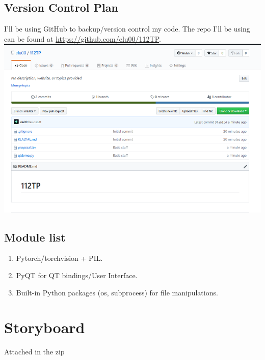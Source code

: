 \documentclass[12pt]{article}
\begin{document}
\subsection{Version Control Plan}
    I'll be using GitHub to backup/version control my code. 
    The repo I'll be using can be found at \href{https://github.com/elu00/112TP}{https://github.com/elu00/112TP}. \\
    \includegraphics[scale=0.8]{screenshot.png}
\subsection{Module list}
\begin{enumerate}
	\item Pytorch/torchvision + PIL.
	\item PyQT for QT bindings/User Interface.
	\item Built-in Python packages (os, subprocess) for file manipulations.
\end{enumerate}
\section{Storyboard}
Attached in the zip
\end{document}
